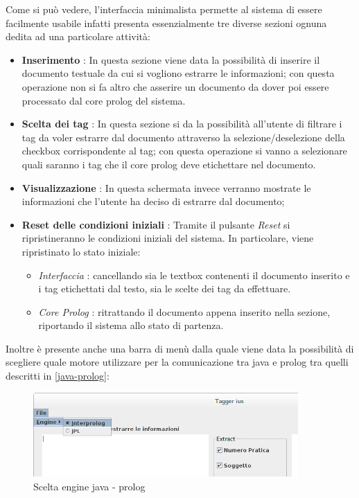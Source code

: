 Come si può vedere, l'interfaccia minimalista permette al sistema di essere facilmente usabile infatti presenta essenzialmente tre diverse sezioni ognuna dedita ad una particolare attività:
    \begin{itemize}
    	\item \textbf{Inserimento} : In questa sezione viene data la possibilità di inserire il documento testuale da cui si vogliono estrarre le informazioni; con questa operazione non si fa altro che asserire un documento da dover poi essere processato dal core prolog del sistema.
    	\item \textbf{Scelta dei tag} : In questa sezione si da la possibilità all'utente di filtrare i tag da voler estrarre dal documento attraverso la selezione/deselezione della checkbox corrispondente al tag; con questa operazione si vanno a selezionare quali saranno i tag che il core prolog deve etichettare nel documento.
    	\item \textbf{Visualizzazione} : In questa schermata invece verranno mostrate le informazioni che l'utente ha deciso di estrarre dal documento;
    	\item \textbf{Reset delle condizioni iniziali} : Tramite il pulsante \emph{Reset} si ripristineranno le condizioni iniziali del sistema. In particolare, viene ripristinato lo stato iniziale:
    	\begin{itemize}
    		\item \emph{Interfaccia} : cancellando sia le textbox contenenti il documento inserito e i tag etichettati dal testo, sia le scelte dei tag da effettuare.
    		\item \emph{Core Prolog} : ritrattando il documento appena inserito nella sezione, riportando il sistema allo stato di partenza.
    	\end{itemize}
    \end{itemize}
Inoltre è presente anche una barra di menù dalla quale viene data la possibilità di scegliere quale motore utilizzare per la comunicazione tra java e prolog tra quelli descritti in \ref{java-prolog}:
\begin{figure}[H]
	\centering
	\includegraphics[width=0.9\textwidth]{img/interfaces/java-engine.png}
	\caption[Schermata java engine]{Scelta engine java - prolog}
	\label{java-engine}
\end{figure}
\clearpage
